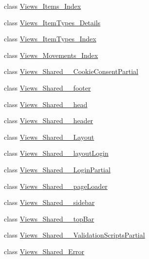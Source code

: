 \begin{DoxyCompactItemize}
class \mbox{\hyperlink{class_asp_net_core_1_1_views___items___index}{Views\+\_\+\+Items\+\_\+\+Index}}
\item 
class \mbox{\hyperlink{class_asp_net_core_1_1_views___item_types___details}{Views\+\_\+\+Item\+Types\+\_\+\+Details}}
\item 
class \mbox{\hyperlink{class_asp_net_core_1_1_views___item_types___index}{Views\+\_\+\+Item\+Types\+\_\+\+Index}}
\item 
class \mbox{\hyperlink{class_asp_net_core_1_1_views___movements___index}{Views\+\_\+\+Movements\+\_\+\+Index}}
\item 
class \mbox{\hyperlink{class_asp_net_core_1_1_views___shared_____cookie_consent_partial}{Views\+\_\+\+Shared\+\_\+\+\_\+\+Cookie\+Consent\+Partial}}
\item 
class \mbox{\hyperlink{class_asp_net_core_1_1_views___shared____footer}{Views\+\_\+\+Shared\+\_\+\+\_\+footer}}
\item 
class \mbox{\hyperlink{class_asp_net_core_1_1_views___shared____head}{Views\+\_\+\+Shared\+\_\+\+\_\+head}}
\item 
class \mbox{\hyperlink{class_asp_net_core_1_1_views___shared____header}{Views\+\_\+\+Shared\+\_\+\+\_\+header}}
\item 
class \mbox{\hyperlink{class_asp_net_core_1_1_views___shared_____layout}{Views\+\_\+\+Shared\+\_\+\+\_\+\+Layout}}
\item 
class \mbox{\hyperlink{class_asp_net_core_1_1_views___shared____layout_login}{Views\+\_\+\+Shared\+\_\+\+\_\+layout\+Login}}
\item 
class \mbox{\hyperlink{class_asp_net_core_1_1_views___shared_____login_partial}{Views\+\_\+\+Shared\+\_\+\+\_\+\+Login\+Partial}}
\item 
class \mbox{\hyperlink{class_asp_net_core_1_1_views___shared____page_loader}{Views\+\_\+\+Shared\+\_\+\+\_\+page\+Loader}}
\item 
class \mbox{\hyperlink{class_asp_net_core_1_1_views___shared____sidebar}{Views\+\_\+\+Shared\+\_\+\+\_\+sidebar}}
\item 
class \mbox{\hyperlink{class_asp_net_core_1_1_views___shared____top_bar}{Views\+\_\+\+Shared\+\_\+\+\_\+top\+Bar}}
\item 
class \mbox{\hyperlink{class_asp_net_core_1_1_views___shared_____validation_scripts_partial}{Views\+\_\+\+Shared\+\_\+\+\_\+\+Validation\+Scripts\+Partial}}
\item 
class \mbox{\hyperlink{class_asp_net_core_1_1_views___shared___error}{Views\+\_\+\+Shared\+\_\+\+Error}}

\end{DoxyCompactItemize}
